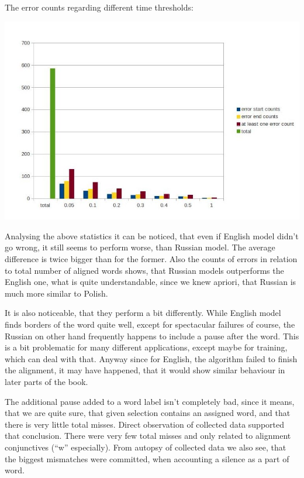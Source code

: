 \documentclass[12pt,a4paper,english]{article}
\begin{document}
The error counts regarding different time thresholds:
\begin{center}
    \includegraphics[scale=0.7]{doktor_piotr_word_russian_results.jpg}
\end{center}

\newpage
Analysing the above statistics it can be noticed, that even if English model didn't go wrong, it still seems to perform worse, than Russian model. The average difference is twice bigger than for the former.  Also the counts of errors in relation to total number of aligned words shows, that Russian models outperforms the English one, what is quite understandable, since we knew apriori, that Russian is much more similar to Polish. \newline

It is also noticeable, that they perform a bit differently. While English model finds borders of the word quite well, except for spectacular failures of course, the Russian on other hand frequently happens to include a pause after the word. This is a bit problematic for many different applications, except maybe for training, which can deal with that. Anyway since for English, the algorithm failed to finish the alignment, it may have happened, that it would show similar behaviour in later parts of the book. \newline

The additional pause added to a word label isn't completely bad, since it means, that we are quite sure, that given selection contains an assigned word, and that there is very little total misses. Direct observation of collected data supported that conclusion. There were very few total misses and only related to alignment conjunctives (“w” especially).\newline
From autopsy of collected data we also see, that the biggest mismatches were committed, when accounting a silence as a part of word. \newline
\end{document}
